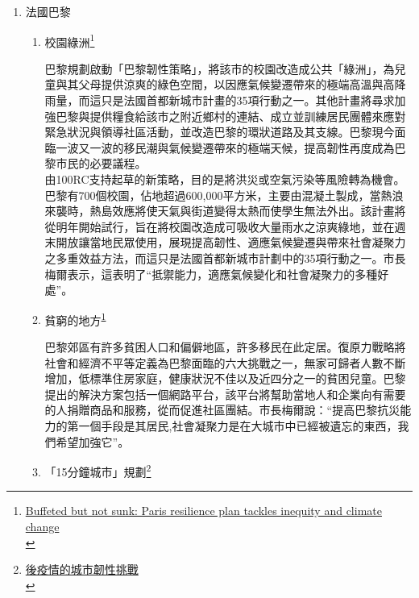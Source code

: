 \documentclass[a4paper,12pt]{article}
\begin{document}
\begin{enumerate}
\item 法國巴黎
\label{sec:orgf8d19dc}

\begin{enumerate}
\item 校園綠洲\footnote{\href{https://www.eco-business.com/news/buffeted-but-not-sunk-paris-resilience-plan-tackles-inequity-and-climate-change/}{Buffeted but not sunk: Paris resilience plan tackles inequity and climate change }\\\label{orgc040ff1}}
\label{sec:org96c46a8}

巴黎規劃啟動「巴黎韌性策略」，將該市的校園改造成公共「綠洲」，為兒童與其父母提供涼爽的綠色空間，以因應氣候變遷帶來的極端高溫與高降雨量，而這只是法國首都新城市計畫的35項行動之一。其他計畫將尋求加強巴黎與提供糧食給該市之附近鄉村的連結、成立並訓練居民團體來應對緊急狀況與領導社區活動，並改造巴黎的環狀道路及其支線。巴黎現今面臨一波又一波的移民潮與氣候變遷帶來的極端天候，提高韌性再度成為巴黎市民的必要議程。\\
由100RC支持起草的新策略，目的是將洪災或空氣污染等風險轉為機會。巴黎有700個校園，佔地超過600,000平方米，主要由混凝土製成，當熱浪來襲時，熱島效應將使天氣與街道變得太熱而使學生無法外出。該計畫將從明年開始試行，旨在將校園改造成可吸收大量雨水之涼爽綠地，並在週末開放讓當地民眾使用，展現提高韌性、適應氣候變遷與帶來社會凝聚力之多重效益方法，而這只是法國首都新城市計劃中的35項行動之一。市長梅爾表示，這表明了“抵禦能力，適應氣候變化和社會凝聚力的多種好處”。\\

\item 貧窮的地方\textsuperscript{\ref{orgc040ff1}}
\label{sec:orgbb67218}

巴黎郊區有許多貧困人口和偏僻地區，許多移民在此定居。復原力戰略將社會和經濟不平等定義為巴黎面臨的六大挑戰之一，無家可歸者人數不斷增加，低標準住房家庭，健康狀況不佳以及近四分之一的貧困兒童。巴黎提出的解決方案包括一個網路平台，該平台將幫助當地人和企業向有需要的人捐贈商品和服務，從而促進社區團結。市長梅爾說：“提高巴黎抗災能力的第一個手段是其居民,社會凝聚力是在大城市中已經被遺忘的東西，我們希望加強它”。\\

\item 「15分鐘城市」規劃\footnote{\href{https://rsprc.ntu.edu.tw/zh-tw/m01-3/understand-risk-society/1550-1100222-covid.html}{後疫情的城市韌性挑戰 }\\}
\label{sec:orgcbfc5ae}


\end{enumerate}
\end{enumerate}
\end{document}
